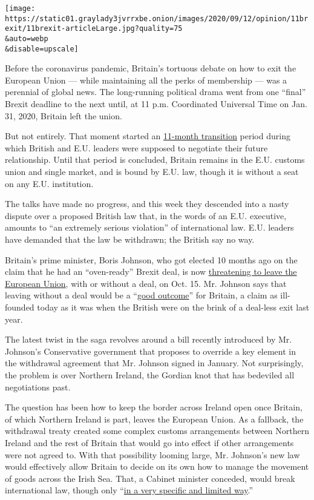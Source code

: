 \texttt{[image: https://static01.graylady3jvrrxbe.onion/images/2020/09/12/opinion/11brexit/11brexit-articleLarge.jpg?quality=75\\\&auto=webp\\\&disable=upscale]}

Before the coronavirus pandemic, Britain's tortuous debate on how to
exit the European Union --- while maintaining all the perks of
membership --- was a perennial of global news. The long-running
political drama went from one ``final'' Brexit deadline to the next
until, at 11 p.m. Coordinated Universal Time on Jan. 31, 2020, Britain
left the union.

But not entirely. That moment started an
\href{https://www.bbc.com/news/uk-politics-50838994}{11-month
transition} period during which British and E.U. leaders were supposed
to negotiate their future relationship. Until that period is concluded,
Britain remains in the E.U. customs union and single market, and is
bound by E.U. law, though it is without a seat on any E.U. institution.

The talks have made no progress, and this week they descended into a
nasty dispute over a proposed British law that, in the words of an E.U.
executive, amounts to ``an extremely serious violation'' of
international law. E.U. leaders have demanded that the law be withdrawn;
the British say no way.

Britain's prime minister, Boris Johnson, who got elected 10 months ago
on the claim that he had an ``oven-ready'' Brexit deal, is now
\href{https://www.nytimes3xbfgragh.onion/2020/09/10/world/europe/brexit-boris-johnson-ireland.html}{threatening
to leave the European Union}, with or without a deal, on Oct. 15. Mr.
Johnson says that leaving without a deal would be a
``\href{https://www.nytimes3xbfgragh.onion/2020/09/08/world/europe/boris-johnson-brexit-northern-ireland.html}{good
outcome}'' for Britain, a claim as ill-founded today as it was when the
British were on the brink of a deal-less exit last year.

The latest twist in the saga revolves around a bill recently introduced
by Mr. Johnson's Conservative government that proposes to override a key
element in the withdrawal agreement that Mr. Johnson signed in January.
Not surprisingly, the problem is over Northern Ireland, the Gordian knot
that has bedeviled all negotiations past.

The question has been how to keep the border across Ireland open once
Britain, of which Northern Ireland is part, leaves the European Union.
As a fallback, the withdrawal treaty created some complex customs
arrangements between Northern Ireland and the rest of Britain that would
go into effect if other arrangements were not agreed to. With that
possibility looming large, Mr. Johnson's new law would effectively allow
Britain to decide on its own how to manage the movement of goods across
the Irish Sea. That, a Cabinet minister conceded, would break
international law, though only
``\href{https://www.bbc.com/news/uk-politics-54073836}{in a very
specific and limited way}.''

